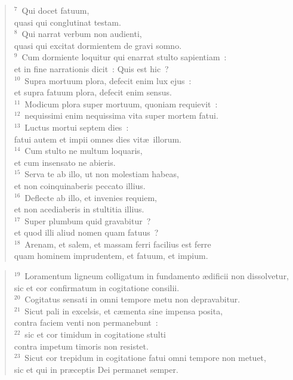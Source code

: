 \begin{flushleft}\begin{verse}${}^{7}$~Qui docet fatuum,\\ quasi qui conglutinat testam.\\
${}^{8}$~Qui narrat verbum non audienti,\\ quasi qui excitat dormientem de gravi somno.\\
${}^{9}$~Cum dormiente loquitur qui enarrat stulto sapientiam~:\\ et in fine narrationis dicit~: Quis est hic~?\\
${}^{10}$~Supra mortuum plora, defecit enim lux ejus~:\\ et supra fatuum plora, defecit enim sensus.\\
${}^{11}$~Modicum plora super mortuum, quoniam requievit~:\\
${}^{12}$~nequissimi enim nequissima vita super mortem fatui.\\
${}^{13}$~Luctus mortui septem dies~:\\ fatui autem et impii omnes dies vit\ae\ illorum.\\
${}^{14}$~Cum stulto ne multum loquaris,\\ et cum insensato ne abieris.\\
${}^{15}$~Serva te ab illo, ut non molestiam habeas,\\ et non coinquinaberis peccato illius.\\
${}^{16}$~Deflecte ab illo, et invenies requiem,\\ et non acediaberis in stultitia illius.\\
${}^{17}$~Super plumbum quid gravabitur~?\\ et quod illi aliud nomen quam fatuus~?\\
${}^{18}$~Arenam, et salem, et massam ferri facilius est ferre\\ quam hominem imprudentem, et fatuum, et impium.\end{verse}\end{flushleft}


\begin{flushleft}\begin{verse}${}^{19}$~Loramentum ligneum colligatum in fundamento \ae dificii non dissolvetur,\\ sic et cor confirmatum in cogitatione consilii.\\
${}^{20}$~Cogitatus sensati in omni tempore metu non depravabitur.\\
${}^{21}$~Sicut pali in excelsis, et c\ae menta sine impensa posita,\\ contra faciem venti non permanebunt~:\\
${}^{22}$~sic et cor timidum in cogitatione stulti\\ contra impetum timoris non resistet.\\
${}^{23}$~Sicut cor trepidum in cogitatione fatui omni tempore non metuet,\\ sic et qui in pr\ae ceptis Dei permanet semper.\end{verse}\end{flushleft}


